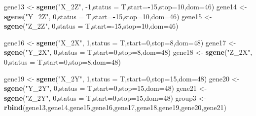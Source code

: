 \documentclass[]{article}
\newenvironment{Shaded}{\begin{snugshade}}{\end{snugshade}}
\newcommand{\DataTypeTok}[1]{\textcolor[rgb]{0.13,0.29,0.53}{#1}}
\newcommand{\DecValTok}[1]{\textcolor[rgb]{0.00,0.00,0.81}{#1}}
\newcommand{\KeywordTok}[1]{\textcolor[rgb]{0.13,0.29,0.53}{\textbf{#1}}}
\newcommand{\NormalTok}[1]{#1}
\newcommand{\OperatorTok}[1]{\textcolor[rgb]{0.81,0.36,0.00}{\textbf{#1}}}
\newcommand{\StringTok}[1]{\textcolor[rgb]{0.31,0.60,0.02}{#1}}
\begin{document}
\begin{Shaded}
\begin{Highlighting}[]
\NormalTok{gene13 <-}\StringTok{ }\KeywordTok{sgene}\NormalTok{(}\StringTok{"X_2Z"}\NormalTok{,         }\DecValTok{-1}\NormalTok{,}\DataTypeTok{status =}\NormalTok{ T,}\DataTypeTok{start=}\OperatorTok{-}\DecValTok{15}\NormalTok{,}\DataTypeTok{stop=}\DecValTok{10}\NormalTok{,}\DataTypeTok{dom=}\DecValTok{46}\NormalTok{)}
\NormalTok{gene14 <-}\StringTok{ }\KeywordTok{sgene}\NormalTok{(}\StringTok{"Y_2Z"}\NormalTok{,          }\DecValTok{0}\NormalTok{,}\DataTypeTok{status =}\NormalTok{ T,}\DataTypeTok{start=}\OperatorTok{-}\DecValTok{15}\NormalTok{,}\DataTypeTok{stop=}\DecValTok{10}\NormalTok{,}\DataTypeTok{dom=}\DecValTok{46}\NormalTok{)}
\NormalTok{gene15 <-}\StringTok{ }\KeywordTok{sgene}\NormalTok{(}\StringTok{"Z_2Z"}\NormalTok{,          }\DecValTok{0}\NormalTok{,}\DataTypeTok{status =}\NormalTok{ T,}\DataTypeTok{start=}\OperatorTok{-}\DecValTok{15}\NormalTok{,}\DataTypeTok{stop=}\DecValTok{10}\NormalTok{,}\DataTypeTok{dom=}\DecValTok{46}\NormalTok{)}

\NormalTok{gene16 <-}\StringTok{ }\KeywordTok{sgene}\NormalTok{(}\StringTok{"X_2X"}\NormalTok{,          }\DecValTok{1}\NormalTok{,}\DataTypeTok{status =}\NormalTok{ T,}\DataTypeTok{start=}\DecValTok{0}\NormalTok{,}\DataTypeTok{stop=}\DecValTok{8}\NormalTok{,}\DataTypeTok{dom=}\DecValTok{48}\NormalTok{)}
\NormalTok{gene17 <-}\StringTok{ }\KeywordTok{sgene}\NormalTok{(}\StringTok{"Y_2X"}\NormalTok{,          }\DecValTok{0}\NormalTok{,}\DataTypeTok{status =}\NormalTok{ T,}\DataTypeTok{start=}\DecValTok{0}\NormalTok{,}\DataTypeTok{stop=}\DecValTok{8}\NormalTok{,}\DataTypeTok{dom=}\DecValTok{48}\NormalTok{)}
\NormalTok{gene18 <-}\StringTok{ }\KeywordTok{sgene}\NormalTok{(}\StringTok{"Z_2X"}\NormalTok{,          }\DecValTok{0}\NormalTok{,}\DataTypeTok{status =}\NormalTok{ T,}\DataTypeTok{start=}\DecValTok{0}\NormalTok{,}\DataTypeTok{stop=}\DecValTok{8}\NormalTok{,}\DataTypeTok{dom=}\DecValTok{48}\NormalTok{)}

\NormalTok{gene19 <-}\StringTok{ }\KeywordTok{sgene}\NormalTok{(}\StringTok{"X_2Y"}\NormalTok{,          }\DecValTok{1}\NormalTok{,}\DataTypeTok{status =}\NormalTok{ T,}\DataTypeTok{start=}\DecValTok{0}\NormalTok{,}\DataTypeTok{stop=}\DecValTok{15}\NormalTok{,}\DataTypeTok{dom=}\DecValTok{48}\NormalTok{)}
\NormalTok{gene20 <-}\StringTok{ }\KeywordTok{sgene}\NormalTok{(}\StringTok{"Y_2Y"}\NormalTok{,          }\DecValTok{0}\NormalTok{,}\DataTypeTok{status =}\NormalTok{ T,}\DataTypeTok{start=}\DecValTok{0}\NormalTok{,}\DataTypeTok{stop=}\DecValTok{15}\NormalTok{,}\DataTypeTok{dom=}\DecValTok{48}\NormalTok{)}
\NormalTok{gene21 <-}\StringTok{ }\KeywordTok{sgene}\NormalTok{(}\StringTok{"Z_2Y"}\NormalTok{,          }\DecValTok{0}\NormalTok{,}\DataTypeTok{status =}\NormalTok{ T,}\DataTypeTok{start=}\DecValTok{0}\NormalTok{,}\DataTypeTok{stop=}\DecValTok{15}\NormalTok{,}\DataTypeTok{dom=}\DecValTok{48}\NormalTok{)}
\NormalTok{group3 <-}\StringTok{ }\KeywordTok{rbind}\NormalTok{(gene13,gene14,gene15,gene16,gene17,gene18,gene19,gene20,gene21)}
\end{Highlighting}
\end{Shaded}
\end{document}
